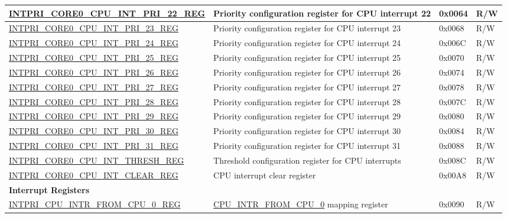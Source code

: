 \begin{longtable}{ | p{10cm} | p{10cm} | p{1.3cm} | p{1cm} | }
\hyperref[regdesc:INTPRICORE0CPUINTPRINREG]{INTPRI\_CORE0\_CPU\_INT\_PRI\_22\_REG} & Priority configuration register for CPU interrupt 22 & 0x0064 & R/W \\ \hline
\hyperref[regdesc:INTPRICORE0CPUINTPRINREG]{INTPRI\_CORE0\_CPU\_INT\_PRI\_23\_REG} & Priority configuration register for CPU interrupt 23 & 0x0068 & R/W \\ \hline
\hyperref[regdesc:INTPRICORE0CPUINTPRINREG]{INTPRI\_CORE0\_CPU\_INT\_PRI\_24\_REG} & Priority configuration register for CPU interrupt 24 & 0x006C & R/W \\ \hline
\hyperref[regdesc:INTPRICORE0CPUINTPRINREG]{INTPRI\_CORE0\_CPU\_INT\_PRI\_25\_REG} & Priority configuration register for CPU interrupt 25 & 0x0070 & R/W \\ \hline
\hyperref[regdesc:INTPRICORE0CPUINTPRINREG]{INTPRI\_CORE0\_CPU\_INT\_PRI\_26\_REG} & Priority configuration register for CPU interrupt 26 & 0x0074 & R/W \\ \hline
\hyperref[regdesc:INTPRICORE0CPUINTPRINREG]{INTPRI\_CORE0\_CPU\_INT\_PRI\_27\_REG} & Priority configuration register for CPU interrupt 27 & 0x0078 & R/W \\ \hline
\hyperref[regdesc:INTPRICORE0CPUINTPRINREG]{INTPRI\_CORE0\_CPU\_INT\_PRI\_28\_REG} & Priority configuration register for CPU interrupt 28 & 0x007C & R/W \\ \hline
\hyperref[regdesc:INTPRICORE0CPUINTPRINREG]{INTPRI\_CORE0\_CPU\_INT\_PRI\_29\_REG} & Priority configuration register for CPU interrupt 29 & 0x0080 & R/W \\ \hline
\hyperref[regdesc:INTPRICORE0CPUINTPRINREG]{INTPRI\_CORE0\_CPU\_INT\_PRI\_30\_REG} & Priority configuration register for CPU interrupt 30 & 0x0084 & R/W \\ \hline
\hyperref[regdesc:INTPRICORE0CPUINTPRINREG]{INTPRI\_CORE0\_CPU\_INT\_PRI\_31\_REG} & Priority configuration register for CPU interrupt 31 & 0x0088 & R/W \\ \hline
\hyperref[regdesc:INTPRICORE0CPUINTTHRESHREG]{INTPRI\_CORE0\_CPU\_INT\_THRESH\_REG} & Threshold configuration register for CPU interrupts  & 0x008C & R/W \\ \hline
\hyperref[regdesc:INTPRICORE0CPUINTCLEARREG]{INTPRI\_CORE0\_CPU\_INT\_CLEAR\_REG} & CPU interrupt clear register & 0x00A8 & R/W \\ \hline
\multicolumn{4}{|l|}{\textbf{Interrupt Registers}} \\ \hline
\hyperref[regdesc:INTPRICPUINTRFROMCPUNREG]{INTPRI\_CPU\_INTR\_FROM\_CPU\_0\_REG} & \hyperref[CPUINTRFROMCPU0]{CPU\_INTR\_FROM\_CPU\_0} mapping register & 0x0090 & R/W \\ \hline

\end{longtable}
